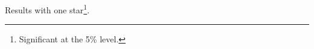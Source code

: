 \documentclass[article]{jss}
\begin{document}
\begin{table}
Results with one star\footnote{Significant at the 5\% level.}.
\caption{Coefficient estimates.}
\end{table}
\end{document}
